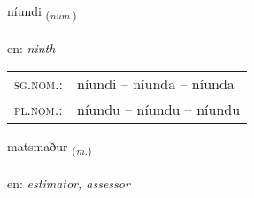 \documentclass[frontgrid, backgrid]{flacards}\usepackage[]{graphicx}\usepackage[]{xcolor}
\begin{document}
\renewcommand{\flhead}{\vskip5pt \fboxsep=0pt {\small\bfseries\footnotesize Töluorð | Numeral}}
\renewcommand{\fcfoot}{\vskip5pt \fboxsep=0pt \hspace{2pt}{\small\bfseries\footnotesize 3K}}

\renewcommand{\blhead}{\vskip5pt {\small\bfseries\footnotesize Töluorð | Numeral }}
\renewcommand{\bcfoot}{\vskip5pt \hspace{2pt}{\small\bfseries\footnotesize 3K}}


{níundi \small{\textsubscript{(\textit{num.})}} \\[1ex] %
\textphonetic{[nijʏntɪ]} \\
en: \emph{ninth} \\  [2ex]
\renewcommand*{\arraystretch}{0.8}
\begin{tabular}{ll}
\textsc{sg.nom.}: & níundi  --  níunda -- níunda \\ 
\textsc{pl.nom.}: & níundu -- níundu -- níundu
\end{tabular}
}

\renewcommand{\flhead}{\vskip5pt \fboxsep=0pt {\small\bfseries\footnotesize Nafnorð | Noun}}
\renewcommand{\fcfoot}{\vskip5pt \fboxsep=0pt \hspace{2pt}{\small\bfseries\footnotesize 3K}}

\renewcommand{\blhead}{\vskip5pt {\small\bfseries\footnotesize Nafnorð | Noun }}
\renewcommand{\bcfoot}{\vskip5pt \hspace{2pt}{\small\bfseries\footnotesize 3K}}


{matsmaður \small{\textsubscript{(\textit{m.})}} \\[1ex] %
\textphonetic{[maːtsmaðʏr]} \\
en: \emph{estimator, assessor} \\  [2ex]
\renewcommand*{\arraystretch}{0.8}
}
\end{document}
